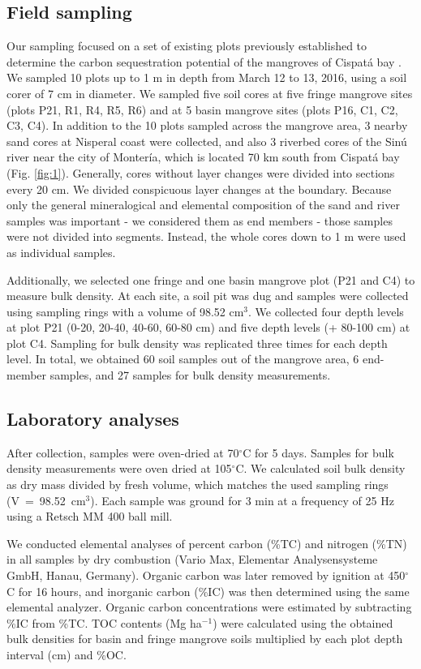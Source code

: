 \subsection{Field sampling}
Our sampling focused on a set of existing plots previously established to determine the carbon sequestration potential of the mangroves of Cispat\'a bay \citep{Bolivar2015}. We sampled 10 plots up to 1 m in depth from March 12 to 13, 2016, using a soil corer of 7 cm in diameter. We sampled five soil cores at five fringe mangrove sites (plots P21, R1, R4, R5, R6) and at 5  basin mangrove sites (plots P16, C1, C2, C3, C4). In addition to the 10 plots sampled across the mangrove area, 3 nearby sand cores at Nisperal coast were collected, and also 3 riverbed cores of the Sin\'{u} river near the city of Monter\'{i}a, which is located 70 km south from Cispat\'{a} bay (Fig. \ref{fig:1}). Generally, cores without layer changes were divided into sections every 20 cm. We divided conspicuous layer changes at the boundary. Because only the general mineralogical and elemental composition of the sand and river samples was important - we considered them as end members - those samples were not divided into segments. Instead, the whole cores down to 1 m were used as individual samples. \par
Additionally, we selected one fringe and one basin mangrove plot (P21 and C4) to measure bulk density. At each site, a soil pit was dug and samples were collected using sampling rings with a volume of 98.52 cm$^3$. We collected four depth levels at plot P21 (0-20, 20-40, 40-60, 60-80 cm) and five depth levels (+ 80-100 cm) at plot C4. Sampling for bulk density was replicated three times for each depth level. In total, we obtained 60 soil samples out of the mangrove area, 6 end-member samples, and 27 samples for bulk density measurements.
\label{sec:2}

\subsection{Laboratory analyses}
After collection, samples were oven-dried at 70$^{\circ}$C for 5 days. Samples for bulk density measurements were oven dried at 105$^{\circ}$C. We calculated soil bulk density as dry mass divided by fresh volume, which matches the used sampling rings \mbox{(V = 98.52 cm$^3$)}. Each sample was ground for 3 min at a frequency of 25 Hz using a Retsch MM 400 ball mill. 

We conducted elemental analyses of percent  carbon (\%TC) and nitrogen (\%TN) in all samples by dry combustion (Vario Max, Elementar Analysensysteme GmbH, Hanau, Germany). Organic carbon was later removed by ignition at 450$^{\circ}$C for 16 hours, and inorganic carbon  (\%IC) was then determined using the same elemental analyzer. Organic carbon concentrations were estimated by subtracting \%IC from \%TC. TOC contents (Mg ha$^{-1}$) were calculated using the obtained bulk densities for basin and fringe mangrove soils multiplied by each plot depth interval (cm) and \%OC.

